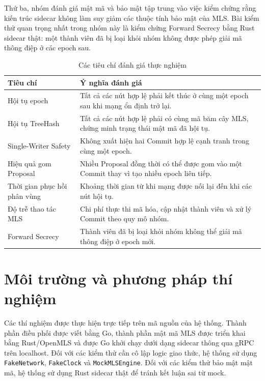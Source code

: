 \documentclass[../DoAn.tex]{subfiles}
\begin{document}
	Thứ ba, nhóm đánh giá mật mã và bảo mật tập trung vào việc kiểm chứng rằng kiến trúc sidecar không làm suy giảm các thuộc tính bảo mật của MLS. Bài kiểm thử quan trọng nhất trong nhóm này là kiểm chứng Forward Secrecy bằng Rust sidecar thật: một thành viên đã bị loại khỏi nhóm không được phép giải mã thông điệp ở các epoch sau.
	
	\begin{table}[htbp]
		\centering
		\caption{Các tiêu chí đánh giá thực nghiệm}
		\label{tab:tham_so_danh_gia}
		\begin{tabular}{|p{4.2cm}|p{9.5cm}|}
			\hline
			\textbf{Tiêu chí} & \textbf{Ý nghĩa đánh giá} \\
			\hline
			Hội tụ epoch & Tất cả các nút hợp lệ phải kết thúc ở cùng một epoch sau khi mạng ổn định trở lại. \\
			\hline
			Hội tụ TreeHash & Tất cả các nút hợp lệ phải có cùng mã băm cây MLS, chứng minh trạng thái mật mã đã hội tụ. \\
			\hline
			Single-Writer Safety & Không xuất hiện hai Commit hợp lệ cạnh tranh trong cùng một epoch. \\
			\hline
			Hiệu quả gom Proposal & Nhiều Proposal đồng thời có thể được gom vào một Commit thay vì tạo nhiều epoch liên tiếp. \\
			\hline
			Thời gian phục hồi phân vùng & Khoảng thời gian từ khi mạng được nối lại đến khi các nút hội tụ. \\
			\hline
			Độ trễ thao tác MLS & Chi phí thực thi mã hóa, cập nhật thành viên và xử lý Commit theo quy mô nhóm. \\
			\hline
			Forward Secrecy & Thành viên đã bị loại khỏi nhóm không thể giải mã thông điệp ở epoch mới. \\
			\hline
		\end{tabular}
	\end{table}
	
	\section{Môi trường và phương pháp thí nghiệm}
	\label{sec:moi_truong_phuong_phap}
	
	Các thí nghiệm được thực hiện trực tiếp trên mã nguồn của hệ thống. Thành phần điều phối được viết bằng Go, thành phần mật mã MLS được triển khai bằng Rust/OpenMLS và được Go khởi chạy dưới dạng sidecar thông qua gRPC trên localhost. Đối với các kiểm thử cần cô lập logic giao thức, hệ thống sử dụng \texttt{FakeNetwork}, \texttt{FakeClock} và \texttt{MockMLSEngine}. Đối với các kiểm thử bảo mật mật mã, hệ thống sử dụng Rust sidecar thật để tránh kết luận sai từ mock.
	
\end{document}
